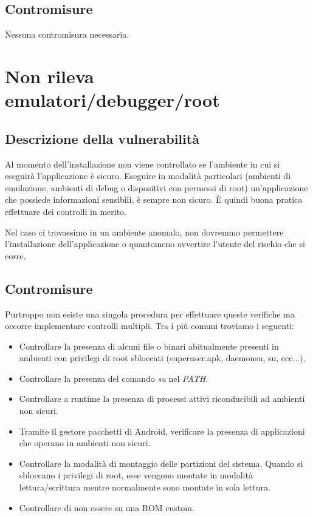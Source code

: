 \subsection{Contromisure}
Nessuna contromisura necessaria.

\section{Non rileva emulatori/debugger/root}

\subsection{Descrizione della vulnerabilità}
Al momento dell'installazione non viene controllato se l'ambiente in cui si eseguirà l'applicazione è sicuro. Eseguire in modalità particolari (ambienti di emulazione, ambienti di debug o dispositivi con permessi di root) un'applicazione che possiede informazioni sensibili, è sempre non sicuro. È quindi buona pratica effettuare dei controlli in merito. 

Nel caso ci trovassimo in un ambiente anomalo, non dovremmo permettere l'installazione dell'applicazione o quantomeno avvertire l'utente del rischio che si corre. 

\subsection{Contromisure}
Purtroppo non esiste una singola procedura per effettuare queste verifiche ma occorre implementare controlli multipli. Tra i più comuni troviamo i seguenti:
\begin{itemize}
	\item Controllare la presenza di alcuni file o binari abitualmente presenti in ambienti con privilegi di root sbloccati (superuser.apk, daemonsu, su, ecc...).
	\item Controllare la presenza del comando \emph{su} nel \emph{PATH}.
	\item Controllare a runtime la presenza di processi attivi riconducibili ad ambienti non sicuri.
	\item Tramite il gestore pacchetti di Android, verificare la presenza di applicazioni che operano in ambienti non sicuri.
	\item Controllare la modalità di montaggio delle partizioni del sistema. Quando si sbloccano i privilegi di root, esse vengono montate in modalità lettura/scrittura mentre normalmente sono montate in sola lettura.
	\item Controllare di non essere su una ROM custom. 
\end{itemize} 